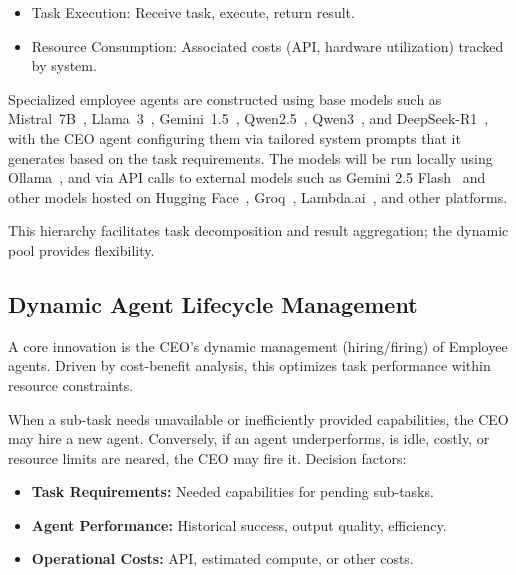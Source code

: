 \documentclass[conference]{IEEEtran}
\begin{document}
\begin{itemize}
\begin{itemize}
            \item Task Execution: Receive task, execute, return result.
            \item Resource Consumption: Associated costs (API, hardware utilization) tracked by system.
        \end{itemize}
        Specialized employee agents are constructed using base models such as Mistral~7B~\cite{jiang2023mistral}, Llama~3~\cite{llama3herd}, Gemini~1.5~\cite{gemini1.5_report}, Qwen2.5~\cite{qwen2.5_report}, Qwen3~\cite{qwen3_blog}, and DeepSeek-R1~\cite{deepseekr1_report}, with the CEO agent configuring them via tailored system prompts that it generates based on the task requirements.
        The models will be run locally using Ollama~\cite{ollama}, and via API calls to external models such as Gemini 2.5 Flash~\cite{gemini25flash} and other models hosted on Hugging Face~\cite{huggingface2025}, Groq~\cite{groq2025}, Lambda.ai~\cite{lambda2025}, and other platforms.
\end{itemize}
This hierarchy facilitates task decomposition and result aggregation; the dynamic pool provides flexibility.

\subsection{Dynamic Agent Lifecycle Management}
\label{subsec:dynamic_mgmt}
A core innovation is the CEO's dynamic management (hiring/firing) of Employee agents. Driven by cost-benefit analysis, this optimizes task performance within resource constraints.

When a sub-task needs unavailable or inefficiently provided capabilities, the CEO may hire a new agent. Conversely, if an agent underperforms, is idle, costly, or resource limits are neared, the CEO may fire it. Decision factors:
\begin{itemize}
    \item \textbf{Task Requirements:} Needed capabilities for pending sub-tasks.
    \item \textbf{Agent Performance:} Historical success, output quality, efficiency.
    \item \textbf{Operational Costs:} API, estimated compute, or other costs.
\end{itemize}
\end{document}
